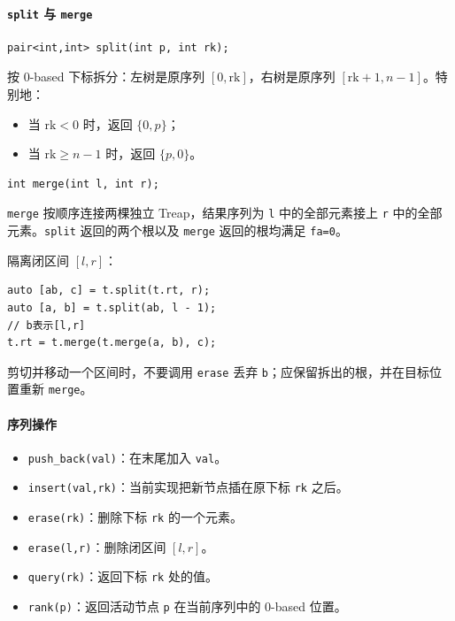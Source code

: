 \paragraph*{\texttt{split} 与 \texttt{merge}}

\begin{verbatim}
pair<int,int> split(int p, int rk);
\end{verbatim}

按 0-based 下标拆分：左树是原序列 $[0,\mathrm{rk}]$，右树是原序列 $[\mathrm{rk}+1,n-1]$。特别地：

\begin{itemize}
  \item 当 $\mathrm{rk}<0$ 时，返回 $\{0,p\}$；
  \item 当 $\mathrm{rk}\ge n-1$ 时，返回 $\{p,0\}$。
\end{itemize}

\begin{verbatim}
int merge(int l, int r);
\end{verbatim}

\texttt{merge} 按顺序连接两棵独立 Treap，结果序列为 \texttt{l} 中的全部元素接上 \texttt{r} 中的全部元素。\texttt{split} 返回的两个根以及 \texttt{merge} 返回的根均满足 \texttt{fa=0}。

隔离闭区间 $[l,r]$：

\begin{verbatim}
auto [ab, c] = t.split(t.rt, r);
auto [a, b] = t.split(ab, l - 1);
// b表示[l,r]
t.rt = t.merge(t.merge(a, b), c);
\end{verbatim}

剪切并移动一个区间时，不要调用 \texttt{erase} 丢弃 \texttt{b}；应保留拆出的根，并在目标位置重新 \texttt{merge}。

\paragraph*{序列操作}

\begin{itemize}
  \item \texttt{push\_back(val)}：在末尾加入 \texttt{val}。
  \item \texttt{insert(val,rk)}：当前实现把新节点插在原下标 \texttt{rk} 之后。
  \item \texttt{erase(rk)}：删除下标 \texttt{rk} 的一个元素。
  \item \texttt{erase(l,r)}：删除闭区间 $[l,r]$。
  \item \texttt{query(rk)}：返回下标 \texttt{rk} 处的值。
  \item \texttt{rank(p)}：返回活动节点 \texttt{p} 在当前序列中的 0-based 位置。
\end{itemize}


